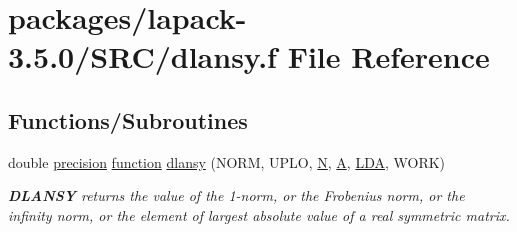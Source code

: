 \hypertarget{dlansy_8f}{}\section{packages/lapack-\/3.5.0/\+S\+R\+C/dlansy.f File Reference}
\label{dlansy_8f}
\subsection*{Functions/\+Subroutines}
\begin{DoxyCompactItemize}
\item 
double \hyperlink{numinquire_8h_a2c8e616467665d0b2814d4c1589ba74e}{precision} \hyperlink{afunc_8m_a7b5e596df91eadea6c537c0825e894a7}{function} \hyperlink{group__doubleSYauxiliary_ga8e0d957efd6f93764d9bc98a7aa1927a}{dlansy} (N\+O\+R\+M, U\+P\+L\+O, \hyperlink{polmisc_8c_a0240ac851181b84ac374872dc5434ee4}{N}, \hyperlink{classA}{A}, \hyperlink{example__user_8c_ae946da542ce0db94dced19b2ecefd1aa}{L\+D\+A}, W\+O\+R\+K)
\begin{DoxyCompactList}\small\item\em {\bfseries D\+L\+A\+N\+S\+Y} returns the value of the 1-\/norm, or the Frobenius norm, or the infinity norm, or the element of largest absolute value of a real symmetric matrix. \end{DoxyCompactList}\end{DoxyCompactItemize}
